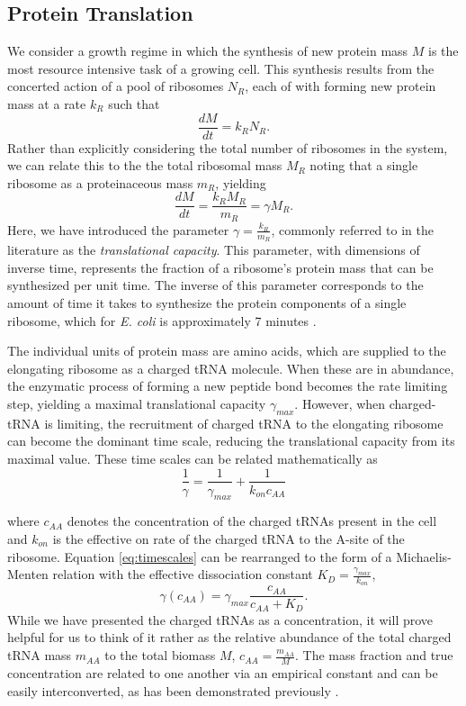 \subsection*{Protein Translation}
We consider a growth regime in which the synthesis of new protein mass $M$ 
is the most resource intensive task of a growing cell. This synthesis results from 
the concerted action of a pool of ribosomes $N_R$, each of with forming new protein 
mass at a rate $k_R$ such that 
\begin{equation}
   \frac{dM}{dt} = k_R N_R. \label{eq:num_ribos} 
\end{equation}
Rather  than explicitly considering the total number of ribosomes in the system, we can 
relate this to the the total ribosomal mass $M_R$ noting that a single ribosome 
as a proteinaceous mass $m_R$, yielding 
\begin{equation}
    \frac{dM}{dt} = \frac{k_R M_R}{m_R} = \gamma M_R. \label{eq:gamma_Mr}
\end{equation}
Here, we have introduced the parameter $\gamma = \frac{k_R}{m_R}$, commonly referred 
to in the literature as the \textit{translational capacity}\cite{scott2010}. This parameter, with 
dimensions of inverse time, represents the fraction of a ribosome's protein mass that 
can be synthesized per unit time. The inverse of this parameter corresponds to the amount of 
time it takes to synthesize the protein components of a single ribosome, which 
for \textit{E. coli} is approximately 7 minutes \cite{dill2011}.

The individual units of protein mass are amino acids, which are supplied to
the elongating ribosome as a charged tRNA molecule. When these are in
abundance, the enzymatic process of forming a new peptide bond becomes the
rate limiting step, yielding a maximal translational capacity $\gamma_{max}$.
However, when charged-tRNA is limiting, the recruitment of charged tRNA to the 
elongating ribosome can become the dominant time scale, reducing the translational capacity 
from its maximal value. These time scales can be related mathematically as 
\begin{equation}
   \frac{1}{\gamma} = \frac{1}{\gamma_{max}} + \frac{1}{k_{on} c_{AA}} \label{eq:timescales} 
\end{equation}

where $c_{AA}$ denotes the concentration of the charged tRNAs present in the cell 
and $k_{on}$ is the effective on rate of the charged tRNA to the A-site 
of the ribosome. Equation \ref{eq:timescales} can be rearranged to the form of a 
Michaelis-Menten relation with the effective dissociation constant $K_D = \frac{\gamma_{max}}{k_{on}}$,
\begin{equation}
\gamma(c_{AA}) = \gamma_{max}\frac{c_{AA}}{c_{AA} + K_D}. \label{eq:gamma_caa}
\end{equation}
While we have presented the charged tRNAs as a concentration, it will prove helpful 
for us to think of it rather as the relative abundance of the total charged tRNA mass 
$m_{AA}$ to the total biomass $M$, $c_{AA} = \frac{m_{AA}}{M}$. The mass fraction and 
true concentration are related to one another via an empirical constant and can 
be easily interconverted, as has been demonstrated previously \cite{klumpp2013, scott2014}. 

